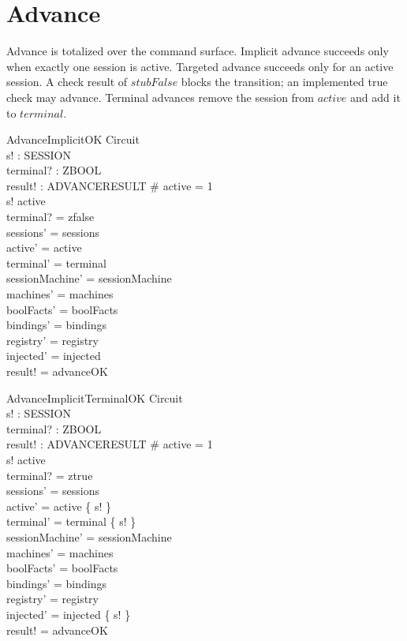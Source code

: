\documentclass[a4paper,10pt,fleqn]{article}
\begin{document}
\section{Advance}

Advance is totalized over the command surface. Implicit advance succeeds only
when exactly one session is active. Targeted advance succeeds only for an active
session. A check result of $stubFalse$ blocks the transition; an implemented true
check may advance. Terminal advances remove the session from $active$ and add it
to $terminal$.

\begin{schema}{AdvanceImplicitOK}
  \Delta Circuit \\
  s! : SESSION \\
  terminal? : ZBOOL \\
  result! : ADVANCERESULT
\where
  \# active = 1 \\
  s! \in active \\
  terminal? = zfalse \\
  sessions' = sessions \\
  active' = active \\
  terminal' = terminal \\
  sessionMachine' = sessionMachine \\
  machines' = machines \\
  boolFacts' = boolFacts \\
  bindings' = bindings \\
  registry' = registry \\
  injected' = injected \\
  result! = advanceOK
\end{schema}

\begin{schema}{AdvanceImplicitTerminalOK}
  \Delta Circuit \\
  s! : SESSION \\
  terminal? : ZBOOL \\
  result! : ADVANCERESULT
\where
  \# active = 1 \\
  s! \in active \\
  terminal? = ztrue \\
  sessions' = sessions \\
  active' = active \setminus \{ s! \} \\
  terminal' = terminal \cup \{ s! \} \\
  sessionMachine' = sessionMachine \\
  machines' = machines \\
  boolFacts' = boolFacts \\
  bindings' = bindings \\
  registry' = registry \\
  injected' = injected \setminus \{ s! \} \\
  result! = advanceOK
\end{schema}
\end{document}
